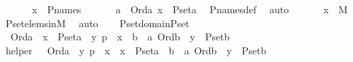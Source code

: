 \begin{isabellebody}
%
\isadelimproof
%
\endisadelimproof
%
\isatagproof
{}\isamarkupfalse%
\ {\isacharminus}{\kern0pt}\ \isanewline
\ \ \isamarkupfalse%
\ {\isachardoublequoteopen}x\ {\isasymin}\ P{\isacharunderscore}{\kern0pt}names{\isachardoublequoteclose}\ \isanewline
\ \ \isamarkupfalse%
\ \isamarkupfalse%
\ a\ \ {\isachardoublequoteopen}Ord{\isacharparenleft}{\kern0pt}a{\isacharparenright}{\kern0pt}{\isachardoublequoteclose}\ {\isachardoublequoteopen}x\ {\isasymin}\ P{\isacharunderscore}{\kern0pt}set{\isacharparenleft}{\kern0pt}a{\isacharparenright}{\kern0pt}{\isachardoublequoteclose}\ \isamarkupfalse%
\ P{\isacharunderscore}{\kern0pt}names{\isacharunderscore}{\kern0pt}def\ \isamarkupfalse%
\ auto\ \isanewline
\ \ \isamarkupfalse%
\ \isamarkupfalse%
\ {\isachardoublequoteopen}x\ {\isasymin}\ M{\isachardoublequoteclose}\ \isamarkupfalse%
\ P{\isacharunderscore}{\kern0pt}set{\isacharunderscore}{\kern0pt}elems{\isacharunderscore}{\kern0pt}in{\isacharunderscore}{\kern0pt}M\ \isamarkupfalse%
\ auto\ \isanewline
{}\isamarkupfalse%
%
\endisatagproof
{\isafoldproof}%
%
\isadelimproof
\ \isanewline
%
\endisadelimproof
\isanewline
{}\isamarkupfalse%
\ P{\isacharunderscore}{\kern0pt}set{\isacharunderscore}{\kern0pt}domain{\isacharunderscore}{\kern0pt}P{\isacharunderscore}{\kern0pt}set\ {\isacharcolon}{\kern0pt}\ \isanewline
\ \ {\isachardoublequoteopen}Ord{\isacharparenleft}{\kern0pt}a{\isacharparenright}{\kern0pt}\ {\isasymLongrightarrow}\ x\ {\isasymin}\ P{\isacharunderscore}{\kern0pt}set{\isacharparenleft}{\kern0pt}a{\isacharparenright}{\kern0pt}\ {\isasymLongrightarrow}\ {\isacharless}{\kern0pt}y{\isacharcomma}{\kern0pt}\ p{\isachargreater}{\kern0pt}\ {\isasymin}\ x\ {\isasymLongrightarrow}\ {\isasymexists}b\ {\isacharless}{\kern0pt}\ a{\isachardot}{\kern0pt}\ Ord{\isacharparenleft}{\kern0pt}b{\isacharparenright}{\kern0pt}\ {\isasymand}\ y\ {\isasymin}\ P{\isacharunderscore}{\kern0pt}set{\isacharparenleft}{\kern0pt}b{\isacharparenright}{\kern0pt}{\isachardoublequoteclose}\ \isanewline
%
\isadelimproof
%
\endisadelimproof
%
\isatagproof
{}\isamarkupfalse%
\ {\isacharminus}{\kern0pt}\isanewline
\ \ \isamarkupfalse%
\ helper\ {\isacharcolon}{\kern0pt}\ \ {\isachardoublequoteopen}Ord{\isacharparenleft}{\kern0pt}a{\isacharparenright}{\kern0pt}\ {\isasymLongrightarrow}\ {\isacharless}{\kern0pt}y{\isacharcomma}{\kern0pt}\ p{\isachargreater}{\kern0pt}\ {\isasymin}\ x\ {\isasymLongrightarrow}\ {\isacharparenleft}{\kern0pt}x\ {\isasymin}\ P{\isacharunderscore}{\kern0pt}set{\isacharparenleft}{\kern0pt}a{\isacharparenright}{\kern0pt}\ {\isasymlongrightarrow}\ {\isacharparenleft}{\kern0pt}{\isasymexists}b\ {\isacharless}{\kern0pt}\ a{\isachardot}{\kern0pt}\ Ord{\isacharparenleft}{\kern0pt}b{\isacharparenright}{\kern0pt}\ {\isasymand}\ y\ {\isasymin}\ P{\isacharunderscore}{\kern0pt}set{\isacharparenleft}{\kern0pt}b{\isacharparenright}{\kern0pt}{\isacharparenright}{\kern0pt}{\isacharparenright}{\kern0pt}{\isachardoublequoteclose}\ \isanewline

\end{isabellebody}
